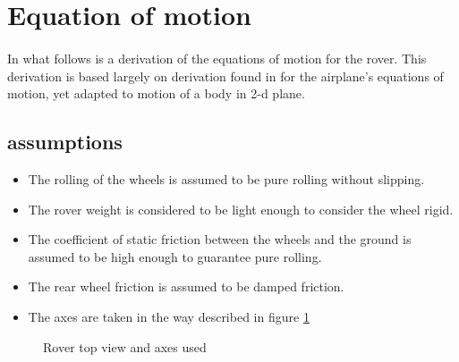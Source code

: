 \documentclass{article}
\begin{document}
	\section{Equation of motion}
	\paragraph{}In what follows is a derivation of the equations of motion for the rover. This derivation is based largely on derivation found in \cite{nelson} for the airplane's equations of motion, yet adapted to motion of a body in 2-d plane.
	
	\subsection*{assumptions}
	\begin{itemize}
		\item The rolling of the wheels is assumed to be pure rolling without slipping.
		\item The rover weight is considered to be light enough to consider the wheel rigid.
		\item The coefficient of static friction between the wheels and the ground is assumed to be high enough to guarantee pure rolling.
		\item The rear wheel friction is assumed to be damped friction. 
		\item The axes are taken in the way described in figure \ref{fig:topView}
	\end{itemize}
	\begin{figure}[H]
		\centering
		\def\svgwidth{200pt}
		
		\caption{Rover top view and axes used}
		\label{fig:topView}
	\end{figure}
\end{document}
